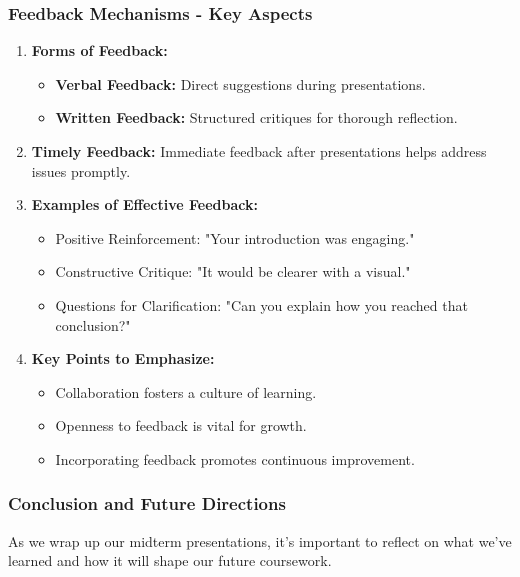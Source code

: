\documentclass{beamer}
\begin{document}
\begin{frame}[fragile]
    \frametitle{Feedback Mechanisms - Key Aspects}
    \begin{enumerate}
        \item \textbf{Forms of Feedback:}
        \begin{itemize}
            \item \textbf{Verbal Feedback:} Direct suggestions during presentations.
            \item \textbf{Written Feedback:} Structured critiques for thorough reflection.
        \end{itemize}
        
        \item \textbf{Timely Feedback:} Immediate feedback after presentations helps address issues promptly.
        
        \item \textbf{Examples of Effective Feedback:}
        \begin{itemize}
            \item Positive Reinforcement: "Your introduction was engaging."
            \item Constructive Critique: "It would be clearer with a visual."
            \item Questions for Clarification: "Can you explain how you reached that conclusion?"
        \end{itemize}
        
        \item \textbf{Key Points to Emphasize:}
        \begin{itemize}
            \item Collaboration fosters a culture of learning.
            \item Openness to feedback is vital for growth.
            \item Incorporating feedback promotes continuous improvement.
        \end{itemize}
    \end{enumerate}
\end{frame}

\begin{frame}[fragile]
    \frametitle{Conclusion and Future Directions}
    As we wrap up our midterm presentations, it's important to reflect on what we've learned and how it will shape our future coursework.
\end{frame}
\end{document}
